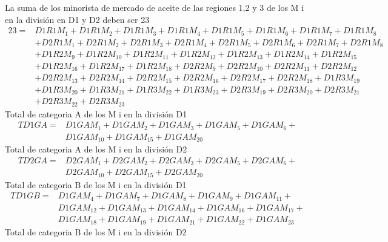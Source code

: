 La suma de los minorista de mercado de aceite de las regiones 1,2 y 3 de los M i en la división en D1 y D2 deben ser 23
\begin{equation*}
\begin{split}
23 =  	&  D1R1M_1 + D1R1M_2 + D1R1M_3 + D1R1M_4 + D1R1M_5 + D1R1M_6 + D1R1M_7 + D1R1M_8 \\
		& + D2R1M_1 + D2R1M_2 + D2R1M_3 + D2R1M_4 + D2R1M_5 + D2R1M_6 + D2R1M_7 + D2R1M_8 \\
		& + D1R2M_9 + D1R2M_{10} + D1R2M_{11} + D1R2M_{12} + D1R2M_{13} + D1R2M_{14} + D1R2M_{15} \\ 
		& + D1R2M_{16} + D1R2M_{17} + D1R2M_{18} + D2R2M_9 + D2R2M_{10} + D2R2M_{11} + D2R2M_{12} \\
		& + D2R2M_{13} + D2R2M_{14} + D2R2M_{15} + D2R2M_{16} + D2R2M_{17} + D2R2M_{18} + D1R3M_{19} \\
		& + D1R3M_{20} + D1R3M_{21} + D1R3M_{22} + D1R3M_{23} + D2R3M_{19} + D2R3M_{20} + D2R3M_{21} \\
		& + D2R3M_{22} + D2R3M_{23}
\end{split}
\end{equation*}
Total de categoria A de los M i en la división D1
\begin{equation*}
\begin{split}
  TD1GA = & D1GAM_1 + D1GAM_2 + D1GAM_3 + D1GAM_5 + D1GAM_6 +\\
          & D1GAM_{10} + D1GAM_{15} + D1GAM_{20} 
\end{split}
\end{equation*}
Total de categoria A de los M i en la división D2
\begin{equation*}
\begin{split}
  TD2GA = & D2GAM_1 + D2GAM_2 + D2GAM_3 + D2GAM_5 + D2GAM_6 +\\
          & D2GAM_{10} + D2GAM_{15} + D2GAM_{20} 
\end{split}
\end{equation*}
Total de categoria B de los M i en la división D1
\begin{equation*}
\begin{split}
  TD1GB = & D1GAM_4 + D1GAM_7 + D1GAM_8 + D1GAM_9 + D1GAM_{11} + \\
          & D1GAM_{12} + D1GAM_{13} + D1GAM_{14} + D1GAM_{16} + D1GAM_{17} +\\
          & D1GAM_{18} + D1GAM_{19} + D1GAM_{21} + D1GAM_{22} + D1GAM_{23}
\end{split}
\end{equation*}
Total de categoria B de los M i en la división D2

